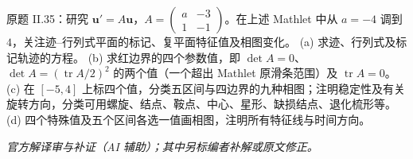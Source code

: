 \begin{exercise}\label{cw:ps9-II-35}原题 II.35：研究 $\mathbf u'=A\mathbf u$，$A=\begin{pmatrix}a&-3\\1&-1\end{pmatrix}$。在上述 Mathlet 中从 $a=-4$ 调到 $4$，关注迹--行列式平面的标记、复平面特征值及相图变化。
(a) 求迹、行列式及标记轨迹的方程。
(b) 求红边界的四个参数值，即 $\det A=0$、$\det A=(\operatorname{tr}A/2)^2$ 的两个值（一个超出 Mathlet 原滑条范围）及 $\operatorname{tr}A=0$。
(c) 在 $[-5,4]$ 上标四个值，分类五区间与四边界的九种相图；注明稳定性及有关旋转方向，分类可用螺旋、结点、鞍点、中心、星形、缺损结点、退化梳形等。
(d) 四个特殊值及五个区间各选一值画相图，注明所有特征线与时间方向。\end{exercise}
\begin{solution}
\textit{官方解译审与补证（AI 辅助）；其中另标编者补解或原文修正。}\par


\end{solution}
